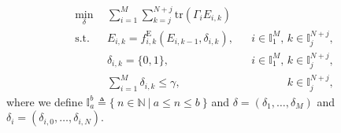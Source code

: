 \documentclass[letterpaper, 10 pt, conference]{ieeeconf}  %
\newcommand{\E}{\mathbb{E}}
\begin{document}
\begin{subequations}
	\label{eq:allocation_Nsa}
	\begin{align}
	\min_{\delta} \ \ & \sum_{i=1}^{M} \sum_{k=j}^{N+j} \mathrm{tr}(\Gamma_{i} E_{i,k}) \\
	\mathrm{s.t.} \ \ 
	& E_{i,k} = f^\mathrm{E}_{i,k}(E_{i,k-1},\delta_{i,k}),&& i\in\mathbb{I}_1^M,\, k\in\mathbb{I}_{j}^{N+j}, \label{eq:Edyn}\\ %
	& \delta_{i,k} = \{0,1\},&& i\in\mathbb{I}_1^M,\, k\in\mathbb{I}_j^{N+j}, \\
	& \sum_{i=1}^{M} \delta_{i,k} \leq \gamma,&&\phantom{i\in\mathbb{I}_1^M,\,} k\in\mathbb{I}_j^{N+j}, \label{eq:comm_limit}
	\end{align}
\end{subequations}
where we define $\mathbb{I}_a^b\triangleq\{ \ n\in\mathbb{N} \ | \ a \leq n \leq b \ \}$ and $\delta = (\delta_{1},\ldots,\delta_M)$ and $\delta_i=(\delta_{i,0},\ldots,\delta_{i,N})$. %

\end{document}
